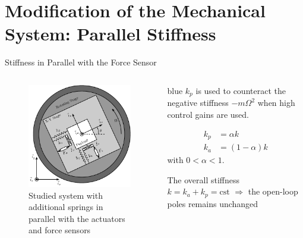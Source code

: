 \documentclass[t, minted]{clean-beamer}
\begin{document}
\section{Modification of the Mechanical System: Parallel Stiffness}
\label{sec:orgfa77c9b}
\begin{frame}[label={sec:org4d07a64}]{Stiffness in Parallel with the Force Sensor}
\vspace{-1em}
\begin{columns}
\begin{column}{0.6\columnwidth}
\begin{figure}[htbp]
\centering
\includegraphics[width=\linewidth]{figs/system_parallel_springs.pdf}
\caption{Studied system with additional springs in parallel with the actuators and force sensors}
\end{figure}
\end{column}

\begin{column}{0.4\columnwidth}
\begin{cbox}{blue}{}
\(k_p\) is used to counteract the negative stiffness \(-m\Omega^2\) when high control gains are used.
\end{cbox}

\vspace{-2em}

\begin{align*}
  k_p &= \alpha k \\
  k_a &= (1 - \alpha) k
\end{align*}
with \(0 < \alpha < 1\).

\vspace{1em}

The overall stiffness \(k = k_a + k_p = \text{cst}\) \(\Longrightarrow\) the open-loop poles remains unchanged
\end{column}
\end{columns}
\end{frame}
\end{document}
